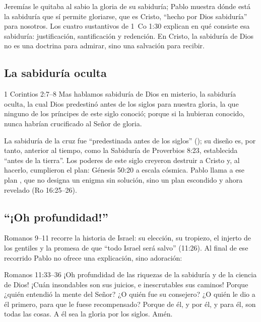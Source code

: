 Jeremías le quitaba al sabio la gloria de su sabiduría; Pablo muestra dónde está la sabiduría que sí permite gloriarse, que es Cristo, ``hecho por Dios sabiduría'' para nosotros. Los cuatro sustantivos de 1~Co 1:30 explican en qué consiste esa sabiduría: justificación, santificación y redención. En Cristo, la sabiduría de Dios no es una doctrina para admirar, sino una salvación para recibir.


\subsection{La sabiduría oculta}

\begin{verso}{1 Corintios 2:7–8}
Mas hablamos sabiduría de Dios en misterio, la sabiduría oculta, la cual Dios predestinó antes de los siglos para nuestra gloria, la que ninguno de los príncipes de este siglo conoció; porque si la hubieran conocido, nunca habrían crucificado al Señor de gloria.
\end{verso}

La sabiduría de la cruz fue ``predestinada antes de los siglos'' (); su diseño es, por tanto, anterior al tiempo, como la Sabiduría de Proverbios 8:23, establecida ``antes de la tierra''. Los poderes de este siglo creyeron destruir a Cristo y, al hacerlo, cumplieron el plan: Génesis 50:20 a escala cósmica. Pablo llama a ese plan , que no designa un enigma sin solución, sino un plan escondido y ahora revelado (Ro 16:25--26).

\subsection{“¡Oh profundidad!”}

Romanos 9--11 recorre la historia de Israel: su elección, su tropiezo, el injerto de los gentiles y la promesa de que ``todo Israel será salvo'' (11:26). Al final de ese recorrido Pablo no ofrece una explicación, sino adoración:

\begin{verso}{Romanos 11:33–36}
¡Oh profundidad de las riquezas de la sabiduría y de la ciencia de Dios! ¡Cuán insondables son sus juicios, e inescrutables sus caminos! Porque ¿quién entendió la mente del Señor? ¿O quién fue su consejero? ¿O quién le dio a él primero, para que le fuese recompensado? Porque de él, y por él, y para él, son todas las cosas. A él sea la gloria por los siglos. Amén.
\end{verso}

